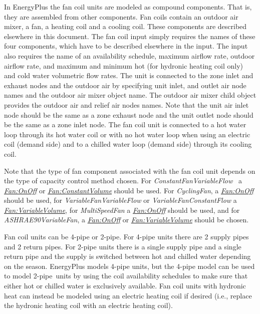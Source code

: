 In EnergyPlus the fan coil units are modeled as compound components. That is, they are assembled from other components. Fan coils contain an outdoor air mixer, a fan, a heating coil and a cooling coil. These components are described elsewhere in this document. The fan coil input simply requires the names of these four components, which have to be described elsewhere in the input. The input also requires the name of an availability schedule, maximum airflow rate, outdoor airflow rate, and maximum and minimum hot (for hydronic heating coil only) and cold water volumetric flow rates. The unit is connected to the zone inlet and exhaust nodes and the outdoor air by specifying unit inlet, and outlet air node names and the outdoor air mixer object name. The outdoor air mixer child object provides the outdoor air and relief air nodes names. Note that the unit air inlet node should be the same as a zone exhaust node and the unit outlet node should be the same as a zone inlet node. The fan coil unit is connected to a hot water loop through its hot water coil or with no hot water loop when using an electric coil (demand side) and to a chilled water loop (demand side) through its cooling coil.

Note that the type of fan component associated with the fan coil unit depends on the type of capacity control method chosen. For \emph{ConstantFanVariableFlow~} a \emph{\hyperref[fanonoff]{Fan:OnOff}} or \emph{\hyperref[fanconstantvolume]{Fan:ConstantVolume}} should be used. For \emph{CyclingFan}, a \emph{\hyperref[fanonoff]{Fan:OnOff}} should be used, for \emph{VariableFanVariableFlow} or \emph{VariableFanConstantFlow} a \emph{\hyperref[fanvariablevolume]{Fan:VariableVolume}}, for \emph{MultiSpeedFan} a \emph{\hyperref[fanonoff]{Fan:OnOff}} should be used, and for \emph{ASHRAE90VariableFan}, a \emph{\hyperref[fanonoff]{Fan:OnOff}} or \emph{\hyperref[fanvariablevolume]{Fan:VariableVolume}} should be chosen.

Fan coil units can be 4-pipe or 2-pipe. For 4-pipe units there are 2 supply pipes and 2 return pipes. For 2-pipe units there is a single supply pipe and a single return pipe and the supply is switched between hot and chilled water depending on the season. EnergyPlus models 4-pipe units, but the 4-pipe model can be used to model 2-pipe~units by using the coil availability schedules to make sure that either hot or chilled water is exclusively available. Fan coil units with hydronic heat can instead be modeled using an electric heating coil if desired (i.e., replace the hydronic heating coil with an electric heating coil).

